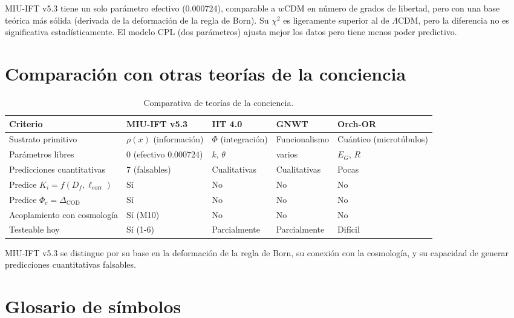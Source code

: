\documentclass[12pt, a4paper]{article}
\theoremstyle{miuThm}
\theoremstyle{remark}
\newcommand{\eps}{0.000724}
\begin{document}
MIU-IFT v5.3 tiene un solo parámetro efectivo ($\eps$), comparable a $w$CDM en número de grados de libertad, pero con una base teórica más sólida (derivada de la deformación de la regla de Born). Su $\chi^2$ es ligeramente superior al de $\Lambda$CDM, pero la diferencia no es significativa estadísticamente. El modelo CPL (dos parámetros) ajusta mejor los datos pero tiene menos poder predictivo.

\clearpage
\section{Comparación con otras teorías de la conciencia}

\begin{table}[h!]
\centering
\caption{Comparativa de teorías de la conciencia.}
\label{tab:teorias}
\begin{tabular}{p{2.5cm}p{3cm}p{3cm}p{3cm}p{2.5cm}}
\toprule
\textbf{Criterio} & \textbf{MIU-IFT v5.3} & \textbf{IIT 4.0} & \textbf{GNWT} & \textbf{Orch-OR} \\
\midrule
Sustrato primitivo & $\rho(x)$ (información) & $\Phi$ (integración) & Funcionalismo & Cuántico (microtúbulos) \\
Parámetros libres & 0 (efectivo $\eps$) & $k$, $\theta$ & varios & $E_G$, $R$ \\
Predicciones cuantitativas & 7 (falsables) & Cualitativas & Cualitativas & Pocas \\
Predice $K_i = f(D_f,\ell_{\text{corr}})$ & Sí & No & No & No \\
Predice $\Phi_c = \Delta_{\text{COD}}$ & Sí & No & No & No \\
Acoplamiento con cosmología & Sí (M10) & No & No & No \\
Testeable hoy & Sí (1-6) & Parcialmente & Parcialmente & Difícil \\
\bottomrule
\end{tabular}
\end{table}

MIU-IFT v5.3 se distingue por su base en la deformación de la regla de Born, su conexión con la cosmología, y su capacidad de generar predicciones cuantitativas falsables.

\clearpage
\section{Glosario de símbolos}
\end{document}
